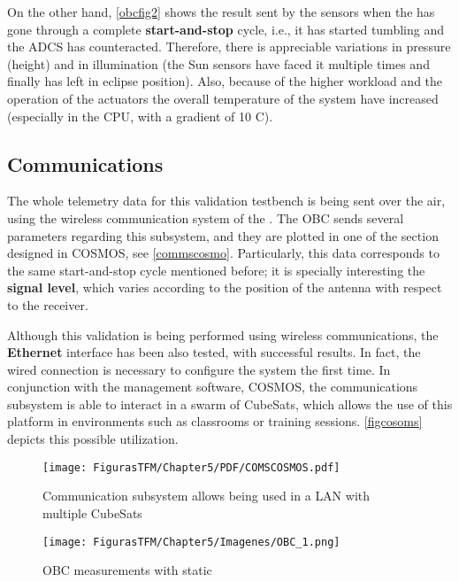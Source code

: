On the other hand, \autoref{obcfig2} shows the result sent by the sensors when the  has gone through a complete \textbf{start-and-stop} cycle, i.e., it has started tumbling and the \acrshort{ADCS} has counteracted. Therefore, there is appreciable variations in pressure (height) and in illumination (the Sun sensors have faced it multiple times and  finally has left in eclipse position). Also, because of the higher workload and the operation of the actuators the overall temperature of the system have increased (especially in the \acrshort{CPU}, with a gradient of 10 \textdegree C).

\subsection{Communications} 

The whole telemetry data for this validation testbench is being sent over the air, using the wireless communication system of the . The \acrshort{OBC} sends several parameters regarding this subsystem, and they are plotted in one of the section designed in COSMOS, see \autoref{commscosmo}. Particularly, this data corresponds to the same start-and-stop cycle mentioned before; it is specially interesting the \textbf{signal level}, which varies according to the position of the antenna with respect to the receiver.


Although this validation is being performed using wireless communications, the \textbf{Ethernet} interface has been also tested, with successful results. In fact, the wired connection is necessary to configure the system the first time. In conjunction with the  management software, COSMOS, the communications subsystem is able to interact in a swarm of CubeSats, which allows the use of this platform in environments such as classrooms or training sessions. \autoref{figcosoms} depicts this possible utilization.

\vspace{0.5cm}

	\begin{figure} [H]
			\centering
			\texttt{[image: FigurasTFM/Chapter5/PDF/COMSCOSMOS.pdf]}
			\caption{Communication subsystem allows being used in a \acrshort{LAN} with multiple CubeSats} 	\label{figcosoms}
\end{figure}


\begin{landscape}
\vspace*{\fill}
	\begin{figure} [H]
			\centering
			\texttt{[image: FigurasTFM/Chapter5/Imagenes/OBC\_1.png]}
			\caption{\acrshort{OBC} measurements with static } 	\label{obcfig1}
			\vspace{-0.5cm}
\end{figure}
\vspace*{\fill}
\end{landscape}


